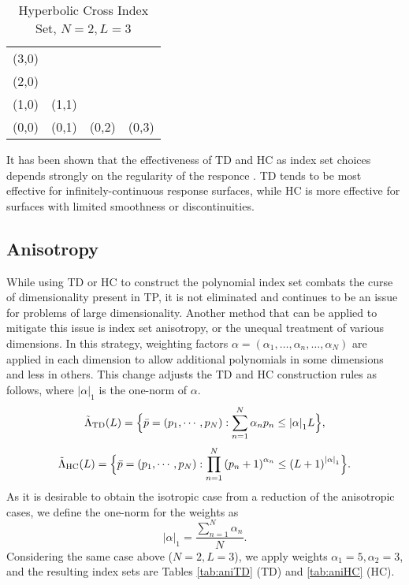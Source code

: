 \begin{table}[h]
  \centering
  \begin{tabular}{c c c c}
    (3,0) &       &       &       \\
    (2,0) &       &       &       \\
    (1,0) & (1,1) &       &       \\
    (0,0) & (0,1) & (0,2) & (0,3)
  \end{tabular}
  \caption{Hyperbolic Cross Index Set, $N=2,L=3$}
  \label{tab:HC}
\end{table}

It has been shown that the effectiveness of TD and HC as index set choices depends strongly on the regularity
of the responce \cite{hctd}.  TD tends to be most effective for infinitely-continuous response surfaces,
while HC is more effective for surfaces with limited smoothness or discontinuities.

\subsection{Anisotropy}
While using TD or HC to construct the polynomial index set combats the curse of dimensionality present in TP,
it is not eliminated and continues to be an issue for problems of large dimensionality.  Another method that can
be applied to mitigate this issue is index set anisotropy, or the unequal treatment of various dimensions.
In this strategy, weighting factors $\alpha=(\alpha_1,\ldots,\alpha_n,\ldots,\alpha_N)$ are applied in each
dimension to allow additional polynomials in some dimensions and less in others.  This change adjusts the TD
and HC construction rules as follows, where $|\alpha|_1$ is the one-norm of $\alpha$.
\begin{equation}
  \tilde\Lambda_\text{TD}(L)=\Big\{\bar p=(p_1,\cdots,p_N):\sum_{n=1}^N \alpha_n p_n \leq \qty|\mathbf{\alpha}|_1 L
\Big\},
\end{equation}
\begin{equation}
  \tilde\Lambda_\text{HC}(L)=\Big\{\bar p=(p_1,\cdots,p_N):\prod_{n=1}^N \qty(p_n+1)^{\alpha_n} \leq
  \qty(L+1)^{\qty|\mathbf{\alpha}|_1} \Big\}.
\end{equation}
As it is desirable to obtain the isotropic case from a reduction of the anisotropic cases, we define the
one-norm for the weights as
\begin{equation}
  |\alpha|_1 = \frac{\sum_{n=1}^N \alpha_n}{N}.
\end{equation}
Considering the same case above ($N=2,L=3$), we apply weights $\alpha_1=5,\alpha_2=3$, and the resulting index
sets are Tables \ref{tab:aniTD} (TD) and \ref{tab:aniHC} (HC).


